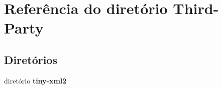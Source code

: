 \section{Referência do diretório Third-\/\+Party}
\label{dir_a6e14826776cc2b1b400af3de26bd231}
\subsection*{Diretórios}
\begin{DoxyCompactItemize}
\item 
diretório {\bf tiny-\/xml2}
\end{DoxyCompactItemize}
